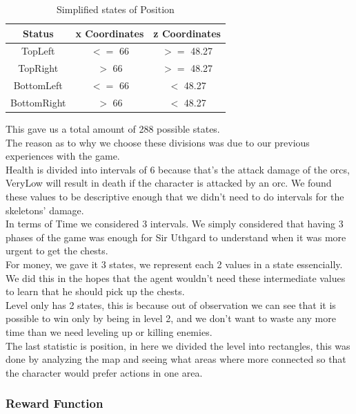 \documentclass{article}
\begin{document}
  \begin{table}[h!]
    \centering
    \caption{Simplified states of Position}
    \label{tab:positionStates}
    \begin{tabular}{c|c|c}
      \textbf{Status} & \textbf{x Coordinates} & \textbf{z Coordinates}\\
      \hline
      TopLeft & $<=$ 66 & $>=$ 48.27\\
      TopRight & $>$ 66 & $>=$ 48.27\\
      BottomLeft & $<=$ 66 & $<$ 48.27\\
      BottomRight & $>$ 66 & $<$ 48.27\\
    \end{tabular}
  \end{table}
  \noindent
  This gave us a total amount of 288 possible states.\\
  The reason as to why we choose these divisions was due to our previous experiences with the game.\\
  Health is divided into intervals of 6 because that's the attack damage of the orcs, VeryLow will result in death if the
  character is attacked by an orc. We found these values to be descriptive enough that we
  didn't need to do intervals for the skeletons' damage.\\
  In terms of Time we considered 3 intervals. We simply considered that having 3 phases of the game was enough for Sir Uthgard to understand when it was more urgent to get the chests.\\
  For money, we gave it 3 states, we represent each 2 values in a state essencially. We did this in the hopes that the agent wouldn't need these intermediate values to learn that he should pick up the chests.\\
  Level only has 2 states, this is because out of observation we can see that it is possible to win only by being in level 2, and we don't want
  to waste any more time than we need leveling up or killing enemies.\\
  The last statistic is position, in here we divided the level into rectangles, this was done by analyzing the map and seeing what areas where more
  connected so that the character would prefer actions in one area.\\

  \subsubsection{Reward Function}
\end{document}
